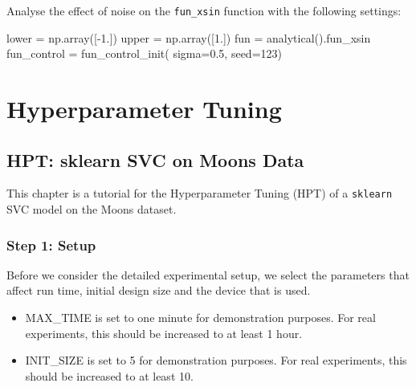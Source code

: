 \documentclass[
  letterpaper,
  DIV=11,
  numbers=noendperiod]{scrreprt}
\newenvironment{Shaded}{\begin{snugshade}}{\end{snugshade}}
\newcommand{\DecValTok}[1]{\textcolor[rgb]{0.68,0.00,0.00}{#1}}
\newcommand{\FloatTok}[1]{\textcolor[rgb]{0.68,0.00,0.00}{#1}}
\newcommand{\NormalTok}[1]{\textcolor[rgb]{0.00,0.23,0.31}{#1}}
\newcommand{\OperatorTok}[1]{\textcolor[rgb]{0.37,0.37,0.37}{#1}}
\providecommand{\tightlist}{%
  \setlength{\itemsep}{0pt}\setlength{\parskip}{0pt}}\usepackage{longtable,booktabs,array}
\begin{document}
Analyse the effect of noise on the \texttt{fun\_xsin} function with the
following settings:

\begin{Shaded}
\begin{Highlighting}[]
\NormalTok{lower }\OperatorTok{=}\NormalTok{ np.array([}\OperatorTok{{-}}\FloatTok{1.}\NormalTok{])}
\NormalTok{upper }\OperatorTok{=}\NormalTok{ np.array([}\FloatTok{1.}\NormalTok{])}
\NormalTok{fun }\OperatorTok{=}\NormalTok{ analytical().fun\_xsin}
\NormalTok{fun\_control }\OperatorTok{=}\NormalTok{ fun\_control\_init(    }
\NormalTok{    sigma}\OperatorTok{=}\FloatTok{0.5}\NormalTok{,}
\NormalTok{    seed}\OperatorTok{=}\DecValTok{123}\NormalTok{)}
\end{Highlighting}
\end{Shaded}

\part{Hyperparameter Tuning}

\hypertarget{sec-hpt-sklearn-svc}{%
\chapter{HPT: sklearn SVC on Moons Data}\label{sec-hpt-sklearn-svc}}

This chapter is a tutorial for the Hyperparameter Tuning (HPT) of a
\texttt{sklearn} SVC model on the Moons dataset.

\hypertarget{sec-setup-10}{%
\section{Step 1: Setup}\label{sec-setup-10}}

Before we consider the detailed experimental setup, we select the
parameters that affect run time, initial design size and the device that
is used.

\begin{tcolorbox}[enhanced jigsaw, left=2mm, title=\textcolor{quarto-callout-caution-color}{\faFire}\hspace{0.5em}{Caution: Run time and initial design size should be increased for real
experiments}, titlerule=0mm, toprule=.15mm, leftrule=.75mm, colbacktitle=quarto-callout-caution-color!10!white, colback=white, arc=.35mm, toptitle=1mm, bottomtitle=1mm, colframe=quarto-callout-caution-color-frame, bottomrule=.15mm, rightrule=.15mm, breakable, coltitle=black, opacitybacktitle=0.6, opacityback=0]

\begin{itemize}
\tightlist
\item
  MAX\_TIME is set to one minute for demonstration purposes. For real
  experiments, this should be increased to at least 1 hour.
\item
  INIT\_SIZE is set to 5 for demonstration purposes. For real
  experiments, this should be increased to at least 10.
\end{itemize}

\end{tcolorbox}
\end{document}
